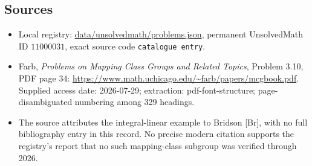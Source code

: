 \documentclass[11pt]{article}
\begin{document}
\subsection{Sources}
\begin{itemize}
\item Local registry: \url{data/unsolvedmath/problems.json}, permanent UnsolvedMath ID $11000031$, exact source code \texttt{catalogue entry}.
\item Farb, \emph{Problems on Mapping Class Groups and Related Topics}, Problem 3.10, PDF page 34: \url{https://www.math.uchicago.edu/~farb/papers/mcgbook.pdf}. Supplied access date: 2026-07-29; extraction: pdf-font-structure; page-disambiguated numbering among 329 headings.
\item The source attributes the integral-linear example to Bridson [Br], with no full bibliography entry in this record. No precise modern citation supports the registry's report that no such mapping-class subgroup was verified through 2026.
\end{itemize}
\end{document}
